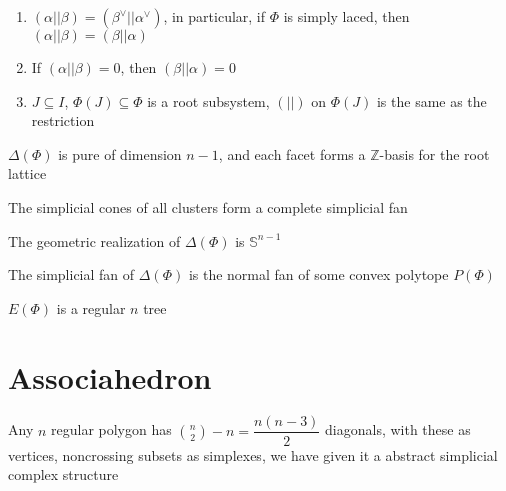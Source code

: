 \documentclass[main]{subfiles}
\begin{document}
\begin{proposition}\hfill
\begin{enumerate}[leftmargin=*,label=\textbf{\arabic*.}]
\item $(\alpha||\beta)=(\beta^\vee||\alpha^\vee)$, in particular, if $\Phi$ is simply laced, then $(\alpha||\beta)=(\beta||\alpha)$
\item If $(\alpha||\beta)=0$, then $(\beta||\alpha)=0$
\item $J\subseteq I$, $\Phi(J)\subseteq\Phi$ is a root subsystem, $(||)$ on $\Phi(J)$ is the same as the restriction
\end{enumerate}
\end{proposition}

\begin{theorem}
$\Delta(\Phi)$ is pure of dimension $n-1$, and each facet forms a $\mathbb Z$-basis for the root lattice
\end{theorem}

\begin{theorem}
The simplicial cones of all clusters form a complete simplicial fan
\end{theorem}

\begin{corollary}
The geometric realization of $\Delta(\Phi)$ is $\mathbb S^{n-1}$
\end{corollary}

\begin{conjecture}
The simplicial fan of $\Delta(\Phi)$ is the normal fan of some convex polytope $P(\Phi)$
\end{conjecture}

\begin{theorem}
$E(\Phi)$ is a regular $n$ tree
\end{theorem}

\begin{example}

\end{example}



\section{Associahedron}

\begin{definition}
Any $n$ regular polygon has $\displaystyle\binom{n}{2}-n=\dfrac{n(n-3)}{2}$ diagonals, with these as vertices, noncrossing subsets as simplexes, we have given it a abstract simplicial complex structure
\end{definition}
\end{document}
